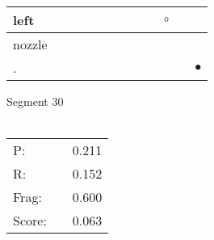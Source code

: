 \documentclass[landscape]{article}
\newcommand{\ssp}{\hspace{2pt}}
\newcommand{\mex}{\cellcolor{g}$\bullet$}
\newcommand{\map}{\cellcolor{y}$\boldsymbol\circ$}
\begin{document}
\begin{tabular}{|l|p{10pt}|p{10pt}|p{10pt}|p{10pt}|p{10pt}|p{10pt}|p{10pt}|p{10pt}|p{10pt}|p{10pt}|p{10pt}|}
\hline
\ssp \cellcolor{ref8}left \ssp&\hspace{2pt}&\hspace{2pt}&\hspace{2pt}&\hspace{2pt}&\hspace{2pt}&\hspace{2pt}&\hspace{2pt}&\hspace{2pt}&\hspace{2pt}\map&\hspace{2pt}&\hspace{2pt}\\
\hline
\ssp nozzle \ssp&\hspace{2pt}&\hspace{2pt}&\hspace{2pt}&\hspace{2pt}&\hspace{2pt}&\hspace{2pt}&\hspace{2pt}&\hspace{2pt}&\hspace{2pt}&\hspace{2pt}&\hspace{2pt}\\
\hline
\ssp \cellcolor{ref10}. \ssp&\hspace{2pt}&\hspace{2pt}&\hspace{2pt}&\hspace{2pt}&\hspace{2pt}&\hspace{2pt}&\hspace{2pt}&\hspace{2pt}&\hspace{2pt}&\hspace{2pt}&\hspace{2pt}\mex\\
\hline
\end{tabular}

\vspace{6pt}
\noindent Segment 30\\\\
\noindent\begin{tabular}{lm{12pt}r}
\hline
P:&&0.211\\
R:&&0.152\\
Frag:&&0.600\\
Score:&&0.063\\
\end{tabular}
\end{document}

